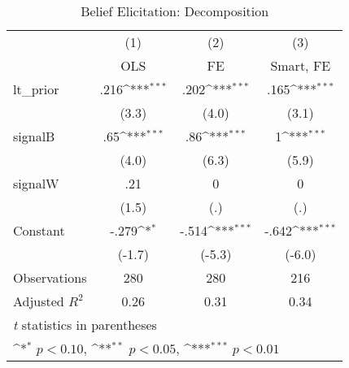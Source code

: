 \begin{table}[htbp]\centering
\def\sym#1{\ifmmode^{#1}\else\(^{#1}\)\fi}
\caption{Belief Elicitation: Decomposition}
\begin{tabular}{l*{3}{c}}
\hline\hline
                &\multicolumn{1}{c}{(1)}&\multicolumn{1}{c}{(2)}&\multicolumn{1}{c}{(3)}\\
                &\multicolumn{1}{c}{OLS}&\multicolumn{1}{c}{FE}&\multicolumn{1}{c}{Smart, FE}\\
\hline
lt\_prior        &     .216\sym{***}&     .202\sym{***}&     .165\sym{***}\\
                &    (3.3)         &    (4.0)         &    (3.1)         \\
signalB         &      .65\sym{***}&      .86\sym{***}&        1\sym{***}\\
                &    (4.0)         &    (6.3)         &    (5.9)         \\
signalW         &      .21         &        0         &        0         \\
                &    (1.5)         &      (.)         &      (.)         \\
Constant        &    -.279\sym{*}  &    -.514\sym{***}&    -.642\sym{***}\\
                &   (-1.7)         &   (-5.3)         &   (-6.0)         \\
\hline
Observations    &      280         &      280         &      216         \\
Adjusted \(R^{2}\)&     0.26         &     0.31         &     0.34         \\
\hline\hline
\multicolumn{4}{l}{\footnotesize \textit{t} statistics in parentheses}\\
\multicolumn{4}{l}{\footnotesize \sym{*} \(p<0.10\), \sym{**} \(p<0.05\), \sym{***} \(p<0.01\)}\\
\end{tabular}
\end{table}
